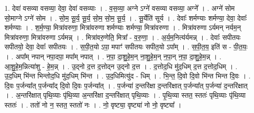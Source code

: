 \documentclass[17pt]{extarticle}
\begin{document}
1. देवा॑ वसव्या वसव्या॒ देवा॒ देवा॑ वसव्याः । . व॒स॒व्या॒ अग्ने ऽग्ने॑ वसव्या वसव्या॒ अग्ने᳚ । . अग्ने॑ सोम सो॒माग्ने ऽग्ने॑ सोम । . सो॒म॒ सू॒र्य॒ सू॒र्य॒ सो॒म॒ सो॒म॒ सू॒र्य॒ । . सू॒र्येति॑ सूर्य । . देवाः᳚ शर्मण्याः शर्मण्या॒ देवा॒ देवाः᳚ शर्मण्याः । . श॒र्म॒ण्या॒ मित्रा॑वरुणा॒ मित्रा॑वरुणा शर्मण्याः शर्मण्या॒ मित्रा॑वरुणा । . मित्रा॑वरुणा ऽर्यमन् नर्यम॒न् मित्रा॑वरुणा॒ मित्रा॑वरुणा ऽर्यमन्न् । . मित्रा॑वरु॒णेति॒ मित्रा᳚ - व॒रु॒णा॒ । . अ॒र्य॒म॒नित्य॑र्यमन्न् । . देवाः᳚ सपीतयः सपीतयो॒ देवा॒ देवाः᳚ सपीतयः । . स॒पी॒त॒यो ऽपा॒ मपाꣳ॑ सपीतयः सपीत॒यो ऽपा᳚म् । . स॒पी॒त॒य॒ इति॑ स - पी॒त॒यः॒ । . अपा᳚म् नपान् नपा॒दपा॒ मपा᳚म् नपात् । . न॒पा॒ दा॒शु॒हे॒म॒न् ना॒शु॒हे॒म॒न् न॒पा॒न् न॒पा॒ दा॒शु॒हे॒म॒न्न् । . आ॒शु॒हे॒म॒न्नित्या॑शु - हे॒म॒न्न् । . उ॒द्नो द॒त्त द॒त्तोद्न उ॒द्नो द॒त्त । . द॒त्तोद॒धि मु॑द॒धिम् द॒त्त द॒त्तोद॒धिम् । . उ॒द॒धिम् भि॑न्त भिन्तोद॒धि मु॑द॒धिम् भि॑न्त । . उ॒द॒धिमित्यु॑द - धिम् । . भि॒न्त॒ दि॒वो दि॒वो भि॑न्त भिन्त दि॒वः । . दि॒वः प॒र्जन्या᳚त् प॒र्जन्या᳚द् दि॒वो दि॒वः प॒र्जन्या᳚त् । . प॒र्जन्या॑ द॒न्तरि॑क्षा द॒न्तरि॑क्षात् प॒र्जन्या᳚त् प॒र्जन्या॑ द॒न्तरि॑क्षात् । . अ॒न्तरि॑क्षात् पृथि॒व्याः पृ॑थि॒व्या अ॒न्तरि॑क्षा द॒न्तरि॑क्षात् पृथि॒व्याः । . पृ॒थि॒व्या स्तत॒ स्ततः॑ पृथि॒व्याः पृ॑थि॒व्या स्ततः॑ । . ततो॑ नो न॒ स्तत॒ स्ततो॑ नः । . नो॒ वृष्ट्या॒ वृष्ट्या॑ नो नो॒ वृष्ट्या᳚ । \newline
\end{document}
